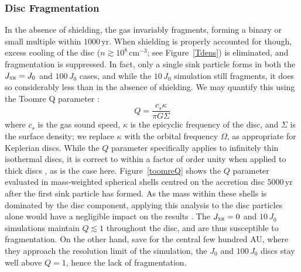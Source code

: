 \documentclass{thesis}
\newcommand{\cc}{\ensuremath{\,\mathrm{cm}^{-3}}\xspace}
\newcommand{\yr}{\ensuremath{\,\mathrm{yr}}\xspace}
\newcommand{\jxr}{\ensuremath{J_{\textsc{xr}}}\xspace}
\newcommand{\RefFig}[1]{\mbox{Figure~\ref{#1}}}
\begin{document}
\subsubsection{Disc Fragmentation}
\label{fragmentation}
In the absence of shielding, the gas invariably fragments, forming a binary or small multiple within $1000\yr$.  When shielding is properly accounted for though, excess cooling of the disc ($n\gtrsim10^8\cc$; see \RefFig{Tdens}) is eliminated, and fragmentation is suppressed.  In fact, only a single sink particle forms in both the $\jxr=J_0$ and $100\,J_0$ cases, and while the $10\,J_0$ simulation still fragments, it does so considerably less than in the absence of shielding.  We may quantify this using the Toomre Q parameter \citep{Toomre1964}: 
\begin{equation}
Q = \frac{c_s \kappa}{\pi G \Sigma}
\end{equation}
where $c_s$ is the gas sound speed, $\kappa$ is the epicyclic frequency of the disc, and $\Sigma$ is the surface density; we replace $\kappa$ with the orbital frequency $\Omega$, as appropriate for Keplerian discs.  While the $Q$ parameter specifically applies to infinitely thin isothermal discs, it is correct to within a factor of order unity when applied to thick discs \citep{Wangetal2010}, as is the case here. \RefFig{toomreQ} shows the $Q$ parameter evaluated in mass-weighted spherical shells centred on the accretion disc $5000\yr$ after the first sink particle has formed.  As the mass within these shells is dominated by the disc component, applying this analysis to the disc particles alone would have a negligible impact on the results \citep[e.g.,][]{Greifetal2012}.  The $\jxr=0$ and $10\,J_0$ simulations maintain $Q\lesssim1$ throughout the disc, and are thus susceptible to fragmentation.  On the other hand, save for the central few hundred AU, where they approach the resolution limit of the simulation, the $J_0$ and $100\,J_0$ discs stay well above $Q=1$, hence the lack of fragmentation.
\end{document}
